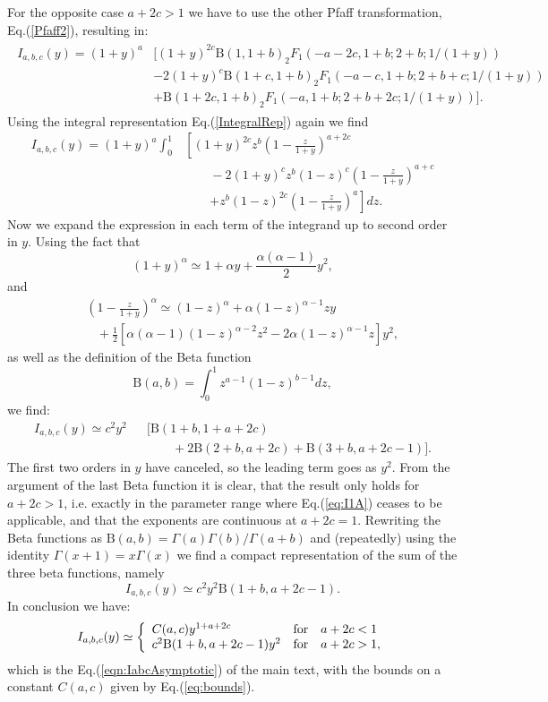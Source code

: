 For the opposite case $a+2c>1$ we have to use the other Pfaff transformation, Eq.(\ref{Pfaff2}), resulting in:
\begin{align}
\begin{split}
 I_{a,b,c}(y) = (1+y)^{a} & \big[  (1+y)^{2c} \mathrm{B}(1,1+b)  _2F_1 \left(-a-2c,1+b;2+b; 1/(1+y) \right)  \\ 
& -2 (1+y)^{c} \mathrm{B}(1+c, 1+b)  _2F_1 \left(-a-c,1+b;2+b+c; 1/(1+y) \right)   \\ 
& +  \mathrm{B}(1+2c , 1+b)  _2F_1 \left(-a,1+b;2+b+2c;1/(1+y) \right) \big]. 
\end{split}
\end{align} 
%
Using the integral representation Eq.(\ref{IntegralRep}) again we find 
\begin{align}
 I_{a,b,c}(y) = (1+y)^{a} \int_0^1 & \left[  (1+y)^{2c} z^b \left( 1-\frac{z}{1+y} \right)^{a+2c}   \right. \nonumber\\
& \qquad -2 (1+y)^{c} z^b (1-z)^{c} \left( 1-\frac{z}{1+y} \right)^{a+c} \nonumber  \\ 
& \qquad \left. + z^b (1-z)^{2c} \left( 1-\frac{z}{1+y} \right)^{a}  \right] dz. \label{eqn:Iabc3}
\end{align} 
Now we expand the expression in each term of the integrand up to second order in $y$. Using the fact that 
\[
(1+y)^{\alpha} \simeq 1 + \alpha y + \frac{\alpha(\alpha-1)}{2} y^2 ,
\]
and 
\begin{eqnarray*}
&& \left( 1-\frac{z}{1+y} \right)^{\alpha} \simeq (1-z)^{\alpha} +  \alpha (1-z)^{\alpha-1} z y \\
&& \;\;\; + \frac{1}{2} \left[ \alpha (\alpha-1) (1-z)^{\alpha-2} z^2 -2 \alpha (1-z)^{\alpha-1}z \right] y^2,
\end{eqnarray*}
as well as the definition of the Beta function
\[
\mathrm{B}(a,b) = \int^1_0 z^{a-1} (1-z)^{b-1} dz ,
\]
we find:
\begin{eqnarray*}
 I_{a,b,c}(y) \simeq c^2 y^2 && [ \mathrm{B}(1+b,1+a+2c) \\
&& \qquad +2\mathrm{B}(2+b,a+2c) + \mathrm{B}(3+b,a+2c-1)].
\end{eqnarray*}
The first two orders in $y$ have canceled, so the leading term goes as $y^2$. From the argument of the last Beta function it is clear, that the result only holds for $a+2c>1$, 
i.e. exactly in the parameter range where Eq.(\ref{eq:I1A}) ceases to be applicable, and that the exponents are continuous at $a+2c=1$. 
Rewriting the Beta functions as $\mathrm{B}(a,b) = \Gamma(a) \Gamma(b)/ \Gamma(a+b)$ and (repeatedly) using the identity $\Gamma(x+1) = x \Gamma(x)$ we find a compact representation
of the sum of the three beta functions, namely 
\begin{equation}
 I_{a,b,c}(y) \simeq c^2 y^2 \mathrm{B}(1+b,a+2c-1).
\end{equation}
In conclusion we have:
\[
I_{a,b,c}(y) \simeq \left\{ \begin{array}{l l l}
C(a,c) y^{1+a+2c} & \mathrm{for} & a+2c< 1 \\
 c^2 \mathrm{B}(1+b,a+2c-1) y^2  & \mathrm{for} & a+2c> 1, 
\end{array} \right.
\]
which is the Eq.(\ref{eqn:IabcAsymptotic}) of the main text, with the bounds on a constant $C(a,c)$ given by Eq.(\ref{eq:bounds}). 